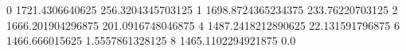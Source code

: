 0 1721.4306640625 256.3204345703125
1 1698.8724365234375 233.76220703125
2 1666.201904296875 201.0916748046875
4 1487.2418212890625 22.131591796875
6 1466.666015625 1.5557861328125
8 1465.1102294921875 0.0
